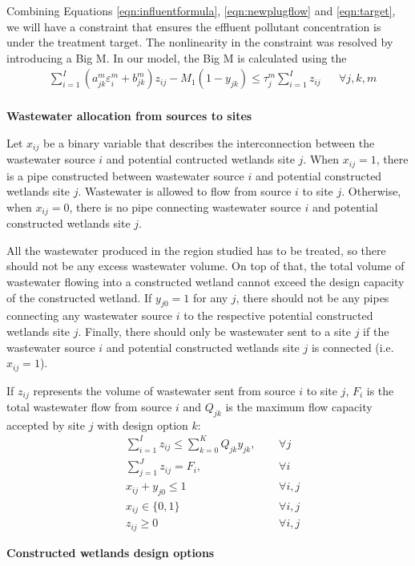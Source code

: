 \documentclass[preprint,12pt,authoryear]{elsarticle}
\begin{document}
Combining Equations \ref{eqn:influentformula}, \ref{eqn:newplugflow} and \ref{eqn:target}, we will have a constraint that ensures the effluent pollutant concentration is under the treatment target. The nonlinearity in the constraint was resolved by introducing a Big M. In our model, the Big M is calculated using the %
\begin{align}
	&\sum_{i=1}^{I} (a_{jk}^m \varepsilon_i^m + b_{jk}^m) z_{ij} - M_1(1 - y_{jk}) \leq \tau_j^m \sum_{i=1}^I z_{ij}  && \forall j,k,m
\end{align}
\\
\noindent\textbf{Wastewater allocation from sources to sites} 

Let $x_{ij}$ be a binary variable that describes the interconnection between the wastewater source $i$ and potential contructed wetlands site $j$. When $x_{ij} = 1$, there is a pipe constructed between wastewater source $i$ and potential constructed wetlands site $j$. Wastewater is allowed to flow from source $i$ to site $j$. Otherwise, when $x_{ij} = 0$, there is no pipe connecting wastewater source $i$ and potential constructed wetlands site $j$. 

All the wastewater produced in the region studied has to be treated, so there should not be any excess wastewater volume. On top of that, the total volume of wastewater flowing into a constructed wetland cannot exceed the design capacity of the constructed wetland. If $y_{j0} = 1$ for any $j$, there should not be any pipes connecting any wastewater source $i$ to the respective potential constructed wetlands site $j$. Finally, there should only be wastewater sent to a site $j$ if the wastewater source $i$ and potential constructed wetlands site $j$ is connected (i.e. $x_{ij} = 1$). 

If $z_{ij}$ represents the volume of wastewater sent from source $i$ to site $j$, $F_{i}$ is the total wastewater flow from source $i$ and $Q_{jk}$ is the maximum flow capacity accepted by site $j$ with design option $k$:
\begin{align}
	&\sum_{i=1}^{I}z_{ij}\leq \sum_{k=0}^{K}Q_{jk}y_{jk},~~ &&\forall j\\
	&\sum_{j=1}^J z_{ij} = F_i,&&\forall i\\
	&x_{ij} + y_{j0} \leq 1 && \forall i,j \\
	&x_{ij}\in\{0,1\}&&\forall i,j\\
	&z_{ij} \geq 0 && \forall i,j %
\end{align}

\noindent\textbf{Constructed wetlands design options} 
\end{document}

